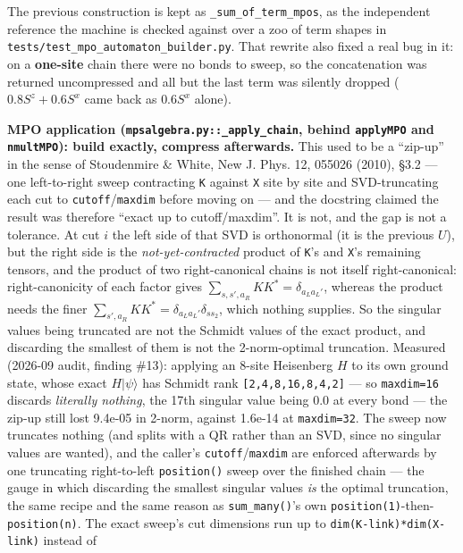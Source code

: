 \documentclass[11pt]{article}
\begin{document}
The previous construction is kept as \texttt{\_sum\_of\_term\_mpos},
as the independent reference the machine is checked against over a zoo of
term shapes in \texttt{tests/test\_mpo\_automaton\_builder.py}. That
rewrite also fixed a real bug in it: on a \textbf{one-site} chain there
were no bonds to sweep, so the concatenation was returned uncompressed and
all but the last term was silently dropped ($0.8 S^z + 0.6 S^x$ came back
as $0.6 S^x$ alone).

\textbf{MPO application (\texttt{mpsalgebra.py::\_apply\_chain}, behind
\texttt{applyMPO} and \texttt{nmultMPO}): build exactly, compress
afterwards.} This used to be a ``zip-up'' in the sense of Stoudenmire \&
White, New J. Phys. 12, 055026 (2010), \S3.2 --- one left-to-right sweep
contracting \texttt{K} against \texttt{X} site by site and SVD-truncating
each cut to \texttt{cutoff}/\texttt{maxdim} before moving on --- and the
docstring claimed the result was therefore ``exact up to
cutoff/maxdim''. It is not, and the gap is not a tolerance. At cut $i$ the
left side of that SVD is orthonormal (it is the previous $U$), but the
right side is the \emph{not-yet-contracted} product of \texttt{K}'s and
\texttt{X}'s remaining tensors, and the product of two right-canonical
chains is not itself right-canonical: right-canonicity of each factor
gives $\sum_{s,s',a_R} K K^* = \delta_{a_L a_L'}$, whereas the product
needs the finer $\sum_{s',a_R} K K^* = \delta_{a_L a_L'}\delta_{s s_2}$,
which nothing supplies. So the singular values being truncated are not
the Schmidt values of the exact product, and discarding the smallest of
them is not the 2-norm-optimal truncation. Measured (2026-09 audit,
finding \#13): applying an 8-site Heisenberg $H$ to its own ground state,
whose exact $H|\psi\rangle$ has Schmidt rank \texttt{[2,4,8,16,8,4,2]} ---
so \texttt{maxdim=16} discards \emph{literally nothing}, the 17th
singular value being 0.0 at every bond --- the zip-up still lost 9.4e-05
in 2-norm, against 1.6e-14 at \texttt{maxdim=32}. The sweep now truncates
nothing (and splits with a QR rather than an SVD, since no singular
values are wanted), and the caller's \texttt{cutoff}/\texttt{maxdim} are
enforced afterwards by one truncating right-to-left \texttt{position()}
sweep over the finished chain --- the gauge in which discarding the
smallest singular values \emph{is} the optimal truncation, the same
recipe and the same reason as \texttt{sum\_many()}'s own
\texttt{position(1)}-then-\texttt{position(n)}. The exact sweep's cut
dimensions run up to \texttt{dim(K-link)*dim(X-link)} instead of
\end{document}
